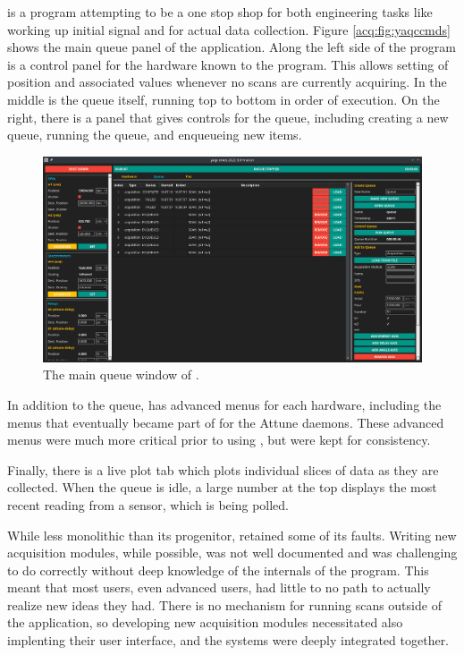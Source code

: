 \yaqccmds{} is a program attempting to be a one stop shop for both engineering tasks like working up initial signal and for actual data collection.
Figure \ref{acq:fig:yaqccmds} shows the main queue panel of the application.
Along the left side of the program is a control panel for the hardware known to the program.
This allows setting of position and associated values whenever no scans are currently acquiring.
In the middle is the queue itself, running top to bottom in order of execution.
On the right, there is a panel that gives controls for the queue, including creating a new queue, running the queue, and enqueueing new items.

\begin{landscape}
\begin{figure}
\includegraphics[width=9in]{"acquisition/images/yaqc-cmds"}
\caption[yaqc-cmds]{
	The main queue window of \yaqccmds{}.
}
\label{acq:fig:yaqcccmds}
\end{figure}
\end{landscape}

In addition to the queue, \yaqccmds{} has advanced menus for each hardware, including the menus that eventually became part of \yaqcqtpy{} for the Attune daemons.
These advanced menus were much more critical prior to using \yaq{}, but were kept for consistency.

Finally, there is a live plot tab which plots individual slices of data as they are collected.
When the queue is idle, a large number at the top displays the most recent reading from a sensor, which is being polled.

While less monolithic than its progenitor, \yaqccmds{} retained some of its faults.
Writing new acquisition modules, while possible, was not well documented and was challenging to do correctly without deep knowledge of the internals of the program.
This meant that most users, even advanced users, had little to no path to actually realize new ideas they had.
There is no mechanism for running scans outside of the application, so developing new acquisition modules necessitated also implenting their user interface, and the systems were deeply integrated together.

